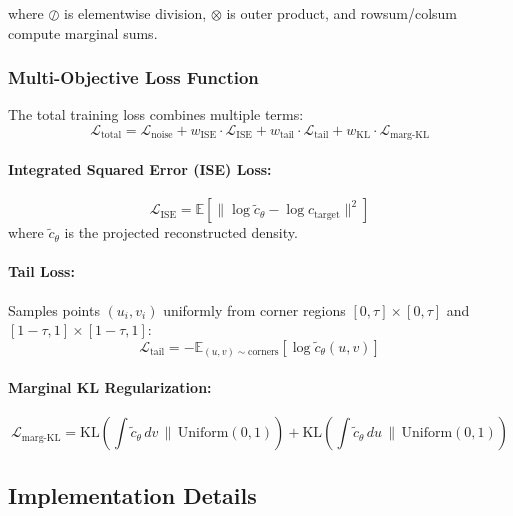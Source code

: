 \documentclass[11pt]{article}
\begin{document}
where $\oslash$ is elementwise division, $\otimes$ is outer product, and rowsum/colsum compute marginal sums.

\subsubsection{Multi-Objective Loss Function}

The total training loss combines multiple terms:
\begin{equation}
\mathcal{L}_{\text{total}} = \mathcal{L}_{\text{noise}} + w_{\text{ISE}} \cdot \mathcal{L}_{\text{ISE}} + w_{\text{tail}} \cdot \mathcal{L}_{\text{tail}} + w_{\text{KL}} \cdot \mathcal{L}_{\text{marg-KL}}
\end{equation}

\paragraph{Integrated Squared Error (ISE) Loss:}
\begin{equation}
\mathcal{L}_{\text{ISE}} = \mathbb{E}\left[ \|\log \tilde{c}_\theta - \log c_{\text{target}}\|^2 \right]
\end{equation}
where $\tilde{c}_\theta$ is the projected reconstructed density.

\paragraph{Tail Loss:}
Samples points $(u_i, v_i)$ uniformly from corner regions $[0, \tau] \times [0, \tau]$ and $[1-\tau, 1] \times [1-\tau, 1]$:
\begin{equation}
\mathcal{L}_{\text{tail}} = -\mathbb{E}_{(u,v) \sim \text{corners}} \left[ \log \tilde{c}_\theta(u,v) \right]
\end{equation}

\paragraph{Marginal KL Regularization:}
\begin{equation}
\mathcal{L}_{\text{marg-KL}} = \text{KL}\left( \int \tilde{c}_\theta \, dv \,\|\, \text{Uniform}(0,1) \right) + \text{KL}\left( \int \tilde{c}_\theta \, du \,\|\, \text{Uniform}(0,1) \right)
\end{equation}

\subsection{Implementation Details}
\end{document}
